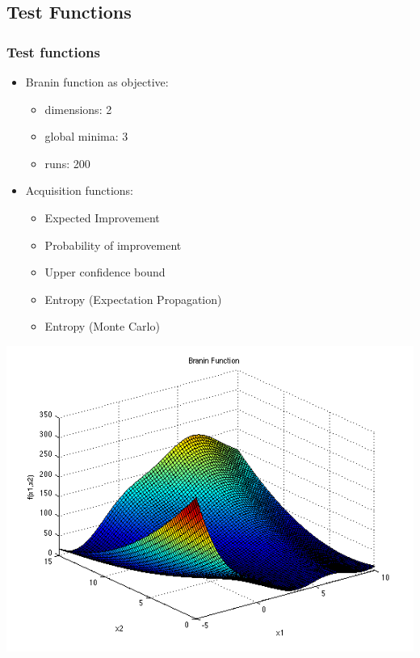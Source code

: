 \documentclass[10pt,handout]{beamer}
\begin{document}
\subsection{Test Functions}
\begin{frame}
\frametitle{Test functions}
\begin{minipage}{0.55\textwidth}
\begin{itemize}
\item Branin function as objective:
\begin{itemize}
\item dimensions: 2
\item global minima: 3
\item runs: 200
\end{itemize}
\item Acquisition functions:
\begin{itemize}
\item Expected Improvement
\item Probability of improvement
\item Upper confidence bound
\item Entropy (Expectation Propagation)
\item Entropy (Monte Carlo)
\end{itemize}
\end{itemize}
\end{minipage}%
\begin{minipage}{0.43\textwidth}
\includegraphics[width=\textwidth]{branin.png}
\end{minipage}
\end{frame}
\end{document}
